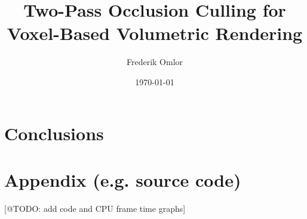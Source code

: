 \documentclass[ a4paper,
                oneside,
                toc=bibliography,
                toc=listof
                ]{scrbook}
\author{Frederik Omlor}
\title{Two-Pass Occlusion Culling for Voxel-Based Volumetric Rendering}
\date{\today}
\begin{document}
 
    \frontmatter
    \makeISWtitle

	\cleardoublepage
	\setcounter{page}{1} %
    \declarationOfOriginality

    

    
    
    \cleardoublepage
    \tableofcontents

    \mainmatter
    
    \nocite{*}

    
    
    
    
    
    
    
    
    \chapter{Conclusions}

    
    \cleardoublepage
    \printbibliography
    \cleardoublepage
    
    
    \cleardoublepage
    \listoffigures
    
    \cleardoublepage
    \listoftables
    
    
    
    \appendix
    \chapter{Appendix (e.g. source code)} \label{cpt-appendix}


    [@TODO: add code and CPU frame time graphs]
\end{document}
